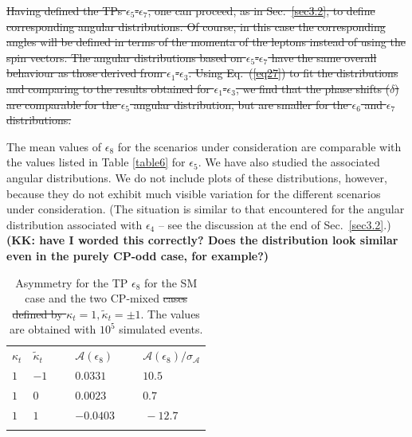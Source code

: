 \documentclass[aps,preprint,tightenlines,floatfix,superscriptaddress,nofootinbib,showpacs]{revtex4-1}
\def\kp{\kappa_t}
\def\kpt{\tilde{\kappa}_t}
\providecommand{\DIFadd}[1]{{\protect\color{blue}\uwave{#1}}} %
\providecommand{\DIFdel}[1]{{\protect\color{red}\sout{#1}}}                      %
\providecommand{\DIFdelbegin}{} %
\providecommand{\DIFdelend}{} %
\providecommand{\DIFaddFL}[1]{\DIFadd{#1}} %
\providecommand{\DIFdelFL}[1]{\DIFdel{#1}} %
\providecommand{\DIFaddbeginFL}{} %
\providecommand{\DIFaddendFL}{} %
\providecommand{\DIFdelbeginFL}{} %
\providecommand{\DIFdelendFL}{} %
\begin{document}
\DIFdelbegin \DIFdel{Having defined the TPs $\epsilon_5$-$\epsilon_7$, one can
proceed, as in Sec.~\ref{sec3.2}, to define corresponding
angular distributions.  Of
course, in this case the corresponding angles will be defined in terms
of the momenta of the leptons instead of using the spin vectors. The angular distributions based on $\epsilon_5$-$\epsilon_7$
have the same overall behaviour as those derived from
$\epsilon_1$-$\epsilon_3$.  Using Eq.~(\ref{eq27})
to fit the distributions and comparing to the results obtained for
$\epsilon_1$-$\epsilon_3$, we find that the phase shifts ($\delta$)
are comparable for the $\epsilon_5$ angular distribution, but are
smaller for the
$\epsilon_6$ and $\epsilon_7$ distributions.  
}%

\DIFdelend The mean values of $\epsilon_8$ for the scenarios under
consideration are comparable with the values listed in Table
\ref{table6} for $\epsilon_5$.
We have also studied the associated angular distributions.
We do not include plots of these distributions, however,
because they
do not exhibit much visible variation for the different
scenarios under consideration.  (The situation is similar
to that encountered for the angular distribution
associated with $\epsilon_4$ -- see the discussion
at the end of Sec.~\ref{sec3.2}.)
{\bf (KK: have I worded this correctly?
  Does the distribution look similar even in the
  purely CP-odd case, for example?)}

\begin{table}[H]
\caption{Asymmetry for the TP $\epsilon_{8}$ for the SM case and the
  two $\mathrm{CP}$-mixed \DIFdelbeginFL \DIFdelFL{cases defined by $\kp=1,\kpt=\pm 1$}\DIFdelendFL \DIFaddbeginFL \DIFaddFL{scenarios}\DIFaddendFL . The
  values are obtained with $10^5$ simulated events.}
\label{table8}
\begin{center}
\begin{tabular}{|C{1cm}|C{1cm}||C{2cm}|C{2cm}|}
\hhline{|====|}
$\kappa_t$&$\tilde{\kappa}_t$~~&$\mathcal{A}(\epsilon_8)$~~&$\mathcal{A}(\epsilon_8)/\sigma_{\mathcal{A}}$ \\ 
\hhline{|====|} 
$1$ & $-1$~~~ & $0.0331$~ & $10.5$~ \\[0.6mm]
\hline
$1$ & $0$ & $0.0023$~ & $0.7$~ \\[0.6mm]
\hline
$1$ & $1$ & $-0.0403$~~~ & $\,-12.7$~~~~ \\[0.6mm]
\hhline{|====|}
\end{tabular}
\end{center} 
\end{table}
\end{document}
